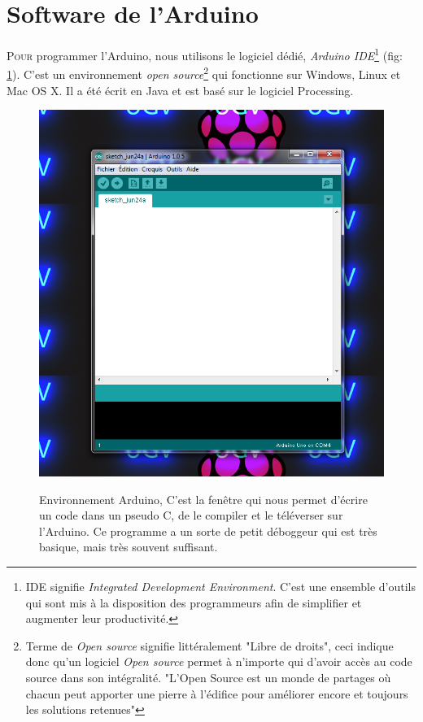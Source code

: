 \documentclass[a4paper,11pt]{report}
\begin{document}
{\section{Software de l'Arduino}
\lettrine{P}{our} programmer l'Arduino, nous utilisons le logiciel dédié, \textit{Arduino IDE}\footnote{IDE signifie \textit{Integrated Development Environment}. C'est une ensemble d'outils qui sont mis à la disposition des programmeurs afin de simplifier et augmenter leur productivité.} (fig: \ref{Environnement Arduino}). C'est un environnement \textit{open source}\footnote{Terme de \textit{Open source}\cite{openSource} signifie littéralement "Libre de droits", ceci indique donc qu'un logiciel \textit{Open source} permet à n'importe qui d'avoir accès au code source dans son intégralité. "L'Open Source est un monde de partages où chacun peut apporter une pierre à l'édifice pour améliorer encore et toujours les solutions retenues"\cite{OpenSourceCit}} qui fonctionne sur Windows, Linux et Mac OS X. Il a été écrit en Java et est basé sur le logiciel Processing.
\begin{figure}[h!]
\begin{center}
\includegraphics[scale=0.5]{arduino-environnement-1}\\
\caption[Environnement de programmation Arduino]{Environnement Arduino\label{Environnement Arduino}, C'est la fenêtre qui nous permet d'écrire un code dans un pseudo C, de le compiler et le téléverser sur l'Arduino. Ce programme a un sorte de petit déboggeur qui est très basique, mais très souvent suffisant.}

\end{center}
\end{figure}}
\end{document}
